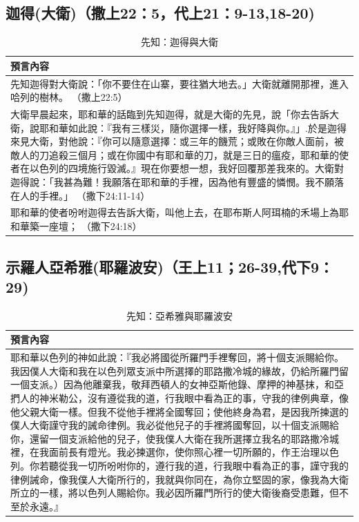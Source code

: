 \subsection{迦得(大衛)（撒上22：5，代上21：9-13,18-20)}
\begin{table}[!hbp]
\centering
\begin{tabular}{p{16cm}}
\hline
\hline
   預言內容\\\hline\hline
 先知迦得對大衛說：「你不要住在山寨，要往猶大地去。」大衛就離開那裡，進入哈列的樹林。  （撒上22:5） \\\hline
大衛早晨起來，耶和華的話臨到先知迦得，就是大衛的先見，說「你去告訴大衛，說耶和華如此說：『我有三樣災，隨你選擇一樣，我好降與你。』」.於是迦得來見大衛，對他說：『你可以隨意選擇：或三年的饑荒；或敗在你敵人面前，被敵人的刀追殺三個月；或在你國中有耶和華的刀，就是三日的瘟疫，耶和華的使者在以色列的四境施行毀滅。』現在你要想一想，我好回覆那差我來的。大衛對迦得說：「我甚為難！我願落在耶和華的手裡，因為他有豐盛的憐憫。我不願落在人的手裡。」  （撒下24:11-14）    \\\hline
 耶和華的使者吩咐迦得去告訴大衛，叫他上去，在耶布斯人阿珥楠的禾場上為耶和華築一座壇； （撒下24:18） \\\hline
\end{tabular}
\caption{先知：迦得與大衛}
\end{table}


\subsection{示羅人亞希雅(耶羅波安)（王上11；26-39,代下9：29)}

\begin{table}[!hbp]
\centering
\begin{tabular}{p{16cm}}
\hline
\hline
 預言內容\\\hline\hline
耶和華以色列的神如此說：『我必將國從所羅門手裡奪回，將十個支派賜給你。我因僕人大衛和我在以色列眾支派中所選擇的耶路撒冷城的緣故，仍給所羅門留一個支派。）因為他離棄我，敬拜西頓人的女神亞斯他錄、摩押的神基抹，和亞捫人的神米勒公，沒有遵從我的道，行我眼中看為正的事，守我的律例典章，像他父親大衛一樣。但我不從他手裡將全國奪回；使他終身為君，是因我所揀選的僕人大衛謹守我的誡命律例。我必從他兒子的手裡將國奪回，以十個支派賜給你，還留一個支派給他的兒子，使我僕人大衛在我所選擇立我名的耶路撒冷城裡，在我面前長有燈光。我必揀選你，使你照心裡一切所願的，作王治理以色列。你若聽從我一切所吩咐你的，遵行我的道，行我眼中看為正的事，謹守我的律例誡命，像我僕人大衛所行的，我就與你同在，為你立堅固的家，像我為大衛所立的一樣，將以色列人賜給你。我必因所羅門所行的使大衛後裔受患難，但不至於永遠。』    \\\hline
\end{tabular}
\caption{先知：亞希雅與耶羅波安}
\end{table}

